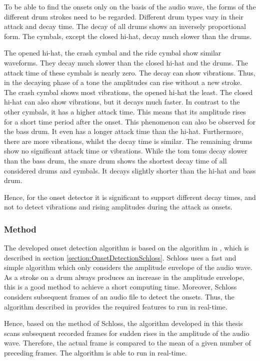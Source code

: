 To be able to find the onsets only on the basis of the audio wave, the forms of the different drum strokes need to be regarded. Different drum types vary in their attack and decay time. The decay of all drums shows an inversely proportional form. The cymbals, except the closed hi-hat, decay much slower than the drums. 

The opened hi-hat, the crash cymbal and the ride cymbal show similar waveforms. They decay much slower than the closed hi-hat and the drums. The attack time of these cymbals is nearly zero. The decay can show vibrations. Thus, in the decaying phase of a tone the amplitudes can rise without a new stroke. The crash cymbal shows most vibrations, the opened hi-hat the least. The closed hi-hat can also show vibrations, but it decays much faster. In contrast to the other cymbals, it has a higher attack time. This means that its amplitude rises for a short time period after the onset. This phenomenon can also be observed for the bass drum. It even has a longer attack time than the hi-hat. Furthermore, there are more vibrations, whilst the decay time is similar. The remaining drums show no significant attack time or vibrations. While the tom toms decay slower than the bass drum, the snare drum shows the shortest decay time of all considered drums and cymbals. It decays slightly shorter than the hi-hat and bass drum. 

Hence, for the onset detector it is significant to support different decay times, and not to detect vibrations and rising amplitudes during the attack as onsets.

\newpage
\subsubsection{Method}

The developed onset detection algorithm is based on the algorithm in \autocite{Schloss:1985}, which is described in section \ref{section:OnsetDetectionSchloss}. Schloss uses a fast and simple algorithm which only considers the amplitude envelope of the audio wave. As a stroke on a drum always produces an increase in the amplitude envelope, this is a good method to achieve a short computing time. Moreover, Schloss considers subsequent frames of an audio file to detect the onsets. Thus, the algorithm described in \autocite{Schloss:1985} provides the required features to run in real-time.

Hence, based on the method of Schloss, the algorithm developed in this thesis scans subsequent recorded frames for sudden rises in the amplitude of the audio wave. Therefore, the actual frame is compared to the mean of a given number of preceding frames. The algorithm is able to run in real-time.

